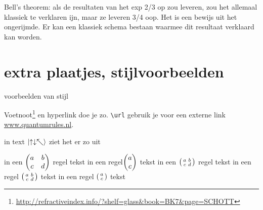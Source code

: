 \documentclass[../../main.tex]{subfiles}
\begin{document}
Bell's theorem: als de resultaten van het exp 2/3 op zou leveren, zou het allemaal klassiek te verklaren ijn, maar ze leveren 3/4 oop. Het is een bewijs uit het ongerijmde.  Er kan een klassiek schema bestaan waarmee dit resultaat verklaard kan worden.

\section{extra plaatjes, stijlvoorbeelden}
voorbeelden van stijl

Voetnoot\footnote{\url{http://refractiveindex.info/?shelf=glass&book=BK7&page=SCHOTT}} en hyperlink doe je zo. 
\verb+\url+ gebruik je voor een externe link \url{www.quantumrules.nl}.

in text $\ket{\uparrow\downarrow\nwarrow}$ ziet het er zo uit

in een $\matrixquantity(a & b \\ c & d)$ regel tekst in een regel$\mqty(a \\ c )$ tekst 
in een $\smallmatrixquantity(a & b \\ c & d)$ regel tekst in een regel $\smqty(a & b \\ c & d)$ tekst
in een regel $\smqty(a\\c)$ tekst



\onlyinsubfile{
\printbibliography}
\notinsubfile{}
\end{document}

